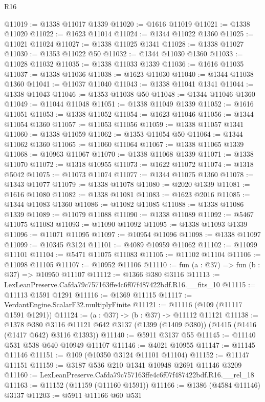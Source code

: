 \begin{lexlean}{R16}
\begin{coremodule}
@11019 := @1338 @11017 @1339
@11020 := @1616 @11019
@11021 := @1338 @11020
@11022 := @1623 @11014
@11024 := @1344 @11022 @1360
@11025 := @11021 @11024
@11027 := @1338 @11025 @1341
@11028 := @1338 @11027
@11030 := @1353 @11022 @50
@11032 := @1344 @11030 @1360
@11033 := @11028 @11032
@11035 := @1338 @11033 @1339
@11036 := @1616 @11035
@11037 := @1338 @11036
@11038 := @1623 @11030
@11040 := @1344 @11038 @1360
@11041 := @11037 @11040
@11043 := @1338 @11041 @1341
@11044 := @1338 @11043
@11046 := @1353 @11038 @50
@11048 := @1344 @11046 @1360
@11049 := @11044 @11048
@11051 := @1338 @11049 @1339
@11052 := @1616 @11051
@11053 := @1338 @11052
@11054 := @1623 @11046
@11056 := @1344 @11054 @1360
@11057 := @11053 @11056
@11059 := @1338 @11057 @1341
@11060 := @1338 @11059
@11062 := @1353 @11054 @50
@11064 := @1344 @11062 @1360
@11065 := @11060 @11064
@11067 := @1338 @11065 @1339
@11068 := @10963 @11067
@11070 := @1338 @11068 @1339
@11071 := @1338 @11070
@11072 := @1318 @10955
@11073 := @1622 @11072
@11074 := @1318 @5042
@11075 := @11073 @11074
@11077 := @1344 @11075 @1360
@11078 := @1343 @11077
@11079 := @1338 @11078
@11080 := @2020 @1339
@11081 := @1616 @11080
@11082 := @1338 @11081
@11083 := @1623 @2016
@11085 := @1344 @11083 @1360
@11086 := @11082 @11085
@11088 := @1338 @11086 @1339
@11089 := @11079 @11088
@11090 := @1338 @11089
@11092 := @5467 @11075 @11083
@11093 := @11090 @11092
@11095 := @1338 @11093 @1339
@11096 := @11071 @11095
@11097 := @10954 @11096
@11098 := @1338 @11097
@11099 := @10345 @3124
@11101 := @4089 @10959 @11062
@11102 := @11099 @11101
@11104 := @5471 @11075 @11083
@11105 := @11102 @11104
@11106 := @11098 @11105
@11107 := @10952 @11106
@11110 := fun (a : @37) => fun (b : @37) => @10950 @11107
@11112 := @1366 @380 @3116
@11113 := LexLeanPreserve.Cafda79c757163ffe4c6f07f487422bdf.R16.__fits_10
@11115 := @11113 @1591 @1291
@11116 := @1369 @11115
@11117 := VerdantEngine.ScalarF32.multiplyFinite
@11121 := @11116 (@109 (@11117 @1591 @1291))
@11124 := (a : @37) -> (b : @37) -> @11112 @11121
@11138 := @1378
    @380
    @3116
    @11121
    @642
    @3137
    (@1399 (@1409 @380))
    (@1415 (@1416 (@1417 @642) @3116 @1393))
@11140 := @5911 @3137 @55
@11145 := @11140 @531 @538 @640 @10949 @11107
@11146 := @4021 @10955
@11147 := @11145 @11146
@11151 := @109 (@10350 @3124 @11101 @11104)
@11152 := @11147 @11151
@11159 := @3187 @536 @210 @1341 @10948 @2691 @11146 @3209
@11160 := LexLeanPreserve.Cafda79c757163ffe4c6f07f487422bdf.R16.__rel_18
@11163 := @11152 (@11159 (@11160 @1591))
@11166 := @1386 (@4584 @11146) @3137
@11203 := @5911
    @11166
    @60
    @531

\end{coremodule}
\end{lexlean}

